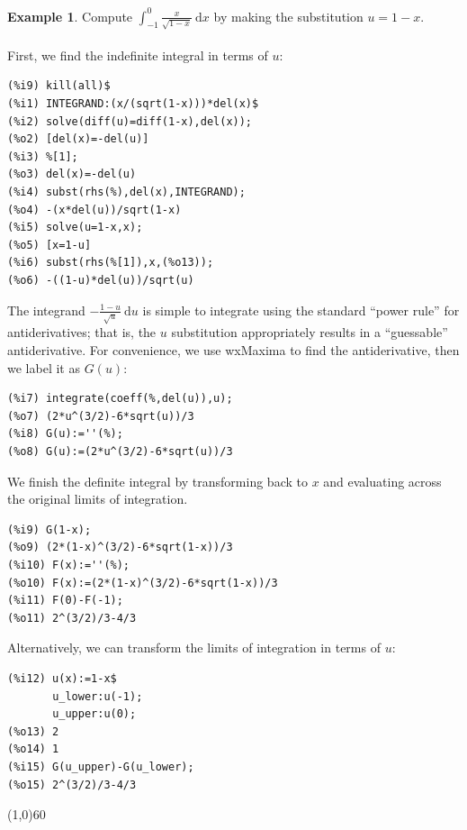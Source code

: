 \documentclass[10.5pt,twoside]{report}
\theoremstyle{definition}
\newtheorem{exmp}{Example}[section]
\begin{document}
\begin{exmp} Compute $\displaystyle \int_{-1}^{0} \frac{x}{\sqrt{1-x}}\ \mathrm{d}x$ by making the substitution $u=1-x$.\\

${}$\\

First, we find the indefinite integral in terms of $u$:

\begin{verbatim}
(%i9) kill(all)$
(%i1) INTEGRAND:(x/(sqrt(1-x)))*del(x)$
(%i2) solve(diff(u)=diff(1-x),del(x));
(%o2) [del(x)=-del(u)]
(%i3) %[1];
(%o3) del(x)=-del(u)
(%i4) subst(rhs(%),del(x),INTEGRAND);
(%o4) -(x*del(u))/sqrt(1-x)
(%i5) solve(u=1-x,x);
(%o5) [x=1-u]
(%i6) subst(rhs(%[1]),x,(%o13));
(%o6) -((1-u)*del(u))/sqrt(u)
\end{verbatim}

The integrand $-\frac{1-u}{\sqrt{u}}\ \mathrm{d}u$ is simple to integrate using the standard ``power rule'' for antiderivatives; that is, the $u$ substitution appropriately results in a ``guessable'' antiderivative.  For convenience, we use wxMaxima to find the antiderivative, then we label it as $G(u)$:

\begin{verbatim}
(%i7) integrate(coeff(%,del(u)),u);
(%o7) (2*u^(3/2)-6*sqrt(u))/3
(%i8) G(u):=''(%);
(%o8) G(u):=(2*u^(3/2)-6*sqrt(u))/3
\end{verbatim}

We finish the definite integral by transforming back to $x$ and evaluating across the original limits of integration.   \\

\begin{verbatim}
(%i9) G(1-x);
(%o9) (2*(1-x)^(3/2)-6*sqrt(1-x))/3
(%i10) F(x):=''(%);
(%o10) F(x):=(2*(1-x)^(3/2)-6*sqrt(1-x))/3
(%i11) F(0)-F(-1);
(%o11) 2^(3/2)/3-4/3
\end{verbatim}

Alternatively, we can transform the limits of integration in terms of $u$:\\

\begin{verbatim}
(%i12) u(x):=1-x$
       u_lower:u(-1);
       u_upper:u(0);
(%o13) 2
(%o14) 1
(%i15) G(u_upper)-G(u_lower);
(%o15) 2^(3/2)/3-4/3
\end{verbatim}


\end{exmp}

\line(1,0){60}
\linethickness{0.5mm}
${}$\\
\end{document}
